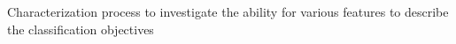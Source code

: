 Characterization process to investigate the ability for various features to describe the classification objectives
\label{fig:char_process}